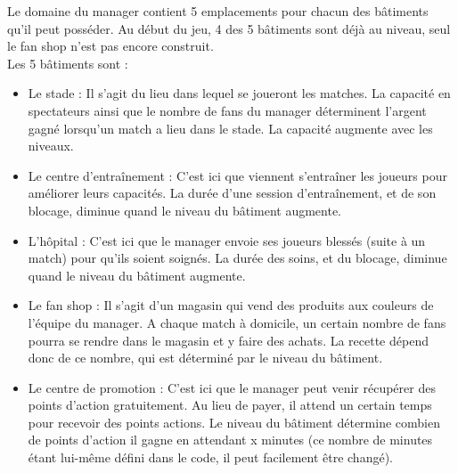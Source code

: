 \documentclass[a4paper,titlepage]{scrreprt}
\begin{document}
        Le domaine du manager contient 5 emplacements pour chacun des bâtiments qu’il peut posséder. Au début du jeu, 4 des 5 bâtiments sont déjà au niveau, seul le fan shop n’est pas encore construit.\\

        Les 5 bâtiments sont :
        \begin{itemize}
        \item Le stade : Il s’agit du lieu dans lequel se joueront les matches. La capacité en spectateurs ainsi que le nombre de fans du manager déterminent l’argent gagné lorsqu’un match a lieu dans le stade. La capacité augmente avec les niveaux.
        \item Le centre d’entraînement : C’est ici que viennent s’entraîner les joueurs pour améliorer leurs capacités. La durée d’une session d’entraînement, et de son blocage, diminue quand le niveau du bâtiment augmente.
        \item L’hôpital : C’est ici que le manager envoie ses joueurs blessés (suite à un match) pour qu’ils soient soignés. La durée des soins, et du blocage, diminue quand le niveau du bâtiment augmente.
        \item Le fan shop : Il s’agit d’un magasin qui vend des produits aux couleurs de l’équipe du manager. A chaque match à domicile, un certain nombre de fans pourra se rendre dans le magasin et y faire des achats. La recette dépend donc de ce nombre, qui est déterminé par le niveau du bâtiment.
        \item Le centre de promotion : C’est ici que le manager peut venir récupérer des points d’action gratuitement. Au lieu de payer, il attend un certain temps pour recevoir des points actions. Le niveau du bâtiment détermine combien de points d’action il gagne en attendant x minutes (ce nombre de minutes étant lui-même défini dans le code, il peut facilement être changé).
        \end{itemize}
\end{document}
